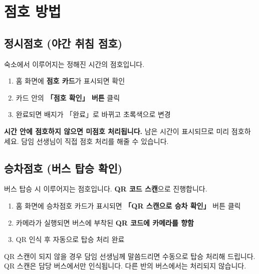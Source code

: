 \documentclass[a4paper,11pt]{article}
\begin{document}
\section{점호 방법}

\subsection{정시점호 (야간 취침 점호)}

숙소에서 이루어지는 정해진 시간의 점호입니다.

\begin{tcolorbox}[stepbox]
\begin{enumerate}
  \item 홈 화면에 \textbf{점호 카드}가 표시되면 확인
  \item 카드 안의 \textbf{「점호 확인」 버튼} 클릭
  \item 완료되면 배지가 「완료」로 바뀌고 초록색으로 변경
\end{enumerate}
\end{tcolorbox}

\begin{tcolorbox}[warnbox]
\textbf{시간 안에 점호하지 않으면 미점호 처리됩니다.} 남은 시간이 표시되므로 미리 점호하세요. 담임 선생님이 직접 점호 처리를 해줄 수 있습니다.
\end{tcolorbox}

\subsection{승차점호 (버스 탑승 확인)}

버스 탑승 시 이루어지는 점호입니다. \textbf{QR 코드 스캔}으로 진행합니다.

\begin{tcolorbox}[stepbox]
\begin{enumerate}
  \item 홈 화면에 승차점호 카드가 표시되면 \textbf{「QR 스캔으로 승차 확인」} 버튼 클릭
  \item 카메라가 실행되면 버스에 부착된 \textbf{QR 코드에 카메라를 향함}
  \item QR 인식 후 자동으로 탑승 처리 완료
\end{enumerate}
\end{tcolorbox}

\begin{tcolorbox}[warnbox]
QR 스캔이 되지 않을 경우 담임 선생님께 말씀드리면 수동으로 탑승 처리해 드립니다.
QR 스캔은 담당 버스에서만 인식됩니다. 다른 반의 버스에서는 처리되지 않습니다.
\end{tcolorbox}
\end{document}
